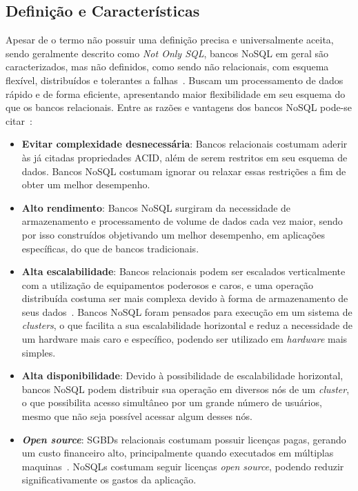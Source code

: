 \subsection{Definição e Características}
Apesar de o termo não possuir uma definição precisa e universalmente aceita, sendo geralmente descrito como \emph{Not Only SQL}, bancos NoSQL em geral são caracterizados, mas não definidos, como sendo não relacionais, com esquema flexível, distribuídos e tolerantes a falhas~\cite{pramod}. Buscam um processamento de dados rápido e de forma eficiente, apresentando maior flexibilidade em seu esquema do que os bancos relacionais.
Entre as razões e vantagens dos bancos NoSQL pode-se citar~\cite{chrisnosql}:
\begin{itemize}
	\item \textbf{Evitar complexidade desnecessária}: Bancos relacionais costumam aderir às já citadas propriedades ACID, além de serem restritos em seu esquema de dados. Bancos NoSQL costumam ignorar ou relaxar essas restrições a fim de obter um melhor desempenho.
	
	\item \textbf{Alto rendimento}: Bancos NoSQL surgiram da necessidade de armazenamento e processamento de volume de dados cada vez maior, sendo por isso construídos objetivando um melhor desempenho, em aplicações específicas, do que de bancos tradicionais.
	
	\item \textbf{Alta escalabilidade}: Bancos relacionais podem ser escalados verticalmente com a utilização de equipamentos poderosos e caros, e uma operação distribuída costuma ser mais complexa devido à forma de armazenamento de seus dados~\cite{leavitt2010nosql}. Bancos NoSQL foram pensados para execução em um sistema de \emph{clusters}, o que facilita a sua escalabilidade horizontal e reduz a necessidade de um hardware mais caro e específico, podendo ser utilizado em \emph{hardware} mais simples. 
	
	\item \textbf{Alta disponibilidade}: Devido à possibilidade de escalabilidade horizontal, bancos NoSQL podem distribuir sua operação em diversos nós de um \emph{cluster}, o que possibilita acesso simultâneo por um grande número de usuários, mesmo que não seja possível acessar algum desses nós. 
	
	\item \textbf{\emph{Open source}}: SGBDs relacionais costumam possuir licenças pagas, gerando um custo financeiro alto, principalmente quando executados em múltiplas maquinas~\cite{pramod}. NoSQLs costumam seguir licenças \emph{open source}, podendo reduzir significativamente os gastos da aplicação. 
\end{itemize}

